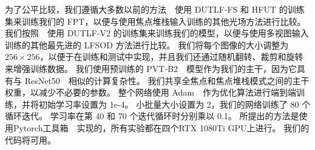 为了公平比较，我们遵循大多数以前的方法~\cite{piao2020exploit, liu2021light}~使用 DUTLF-FS 和 HFUT 的训练集来训练我们的 FPT，以便与使用焦点堆栈输入训练的其他光场方法进行比较。 我们按照~\cite{wang2022lfbcnet,jing2021occlusion}~使用 DUTLF-V2 的训练集来训练我们的模型，以便与使用多视图输入训练的其他最先进的 LFSOD 方法进行比较。 我们将每个图像的大小调整为 $256 \times 256$，以便于在训练和测试中实现，并且我们还通过随机翻转、裁剪和旋转来增强训练数据。
我们使用预训练的 PVT-B2~\cite{wang2022pvt}~模型作为我们的主干，因为它具有与 ResNet50~\cite{he2016deep}~相似的计算复杂性。 我们共享全焦点和焦点堆栈模式之间的主干权重，以减少不必要的参数。 整个网络使用 Adam~\cite{kingma2014adam}~作为优化算法进行端到端训练，并将初始学习率设置为 1e-4。 小批量大小设置为 2，我们的网络训练了 80 个循环迭代。 学习率在第 40 和 70 个迭代循环时分别乘以 0.1。 所提出的方法是使用Pytorch工具箱~\cite{paszke2017automatic}~实现的，所有实验都在四个RTX 1080Ti GPU上进行。 我们的代码将可用。 









